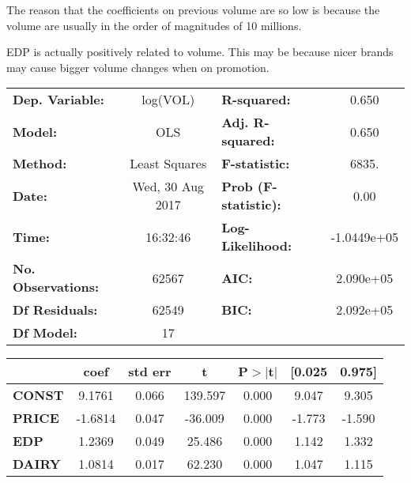 \documentclass{article}
\begin{document}
The reason that the coefficients on previous volume are so low is because the volume are usually in the order of magnitudes of 10 millions.


EDP is actually positively related to volume. This may be because nicer brands may cause bigger volume changes when on promotion.





\begin{center}
\begin{tabular}{lclc}
\toprule
\textbf{Dep. Variable:}    &        log(VOL)         & \textbf{  R-squared:         } &      0.650   \\
\textbf{Model:}            &       OLS        & \textbf{  Adj. R-squared:    } &      0.650   \\
\textbf{Method:}           &  Least Squares   & \textbf{  F-statistic:       } &      6835.   \\
\textbf{Date:}             & Wed, 30 Aug 2017 & \textbf{  Prob (F-statistic):} &      0.00    \\
\textbf{Time:}             &     16:32:46     & \textbf{  Log-Likelihood:    } & -1.0449e+05  \\
\textbf{No. Observations:} &       62567      & \textbf{  AIC:               } &  2.090e+05   \\
\textbf{Df Residuals:}     &       62549      & \textbf{  BIC:               } &  2.092e+05   \\
\textbf{Df Model:}         &          17      & \textbf{                     } &              \\
\bottomrule
\end{tabular}
\begin{tabular}{lcccccc}
               & \textbf{coef} & \textbf{std err} & \textbf{t} & \textbf{P$>$$|$t$|$} & \textbf{[0.025} & \textbf{0.975]}  \\
\midrule
\textbf{CONST} &       9.1761  &        0.066     &   139.597  &         0.000        &        9.047    &        9.305     \\
\textbf{PRICE}    &      -1.6814  &        0.047     &   -36.009  &         0.000        &       -1.773    &       -1.590     \\
\textbf{EDP}    &       1.2369  &        0.049     &    25.486  &         0.000        &        1.142    &        1.332     \\
\textbf{DAIRY}    &       1.0814  &        0.017     &    62.230  &         0.000        &        1.047    &        1.115     \\

\end{tabular}
\end{center}
\end{document}
